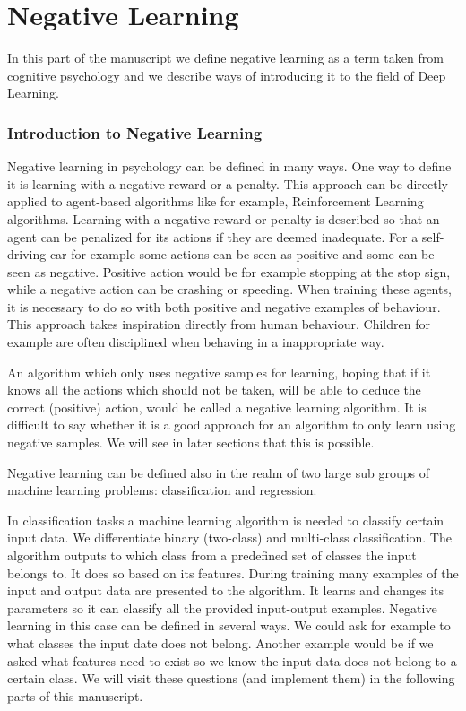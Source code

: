 \documentclass[b5paper]{book}
\begin{document}
\part{Negative Learning}

In this part of the manuscript we define negative learning as a term taken from cognitive psychology and we describe ways of introducing it to the field of Deep Learning.

\section{Introduction to Negative Learning}

Negative learning in psychology can be defined in many ways. One way to define it is learning with a negative reward or a penalty. This approach can be directly applied to agent-based algorithms like for example, Reinforcement Learning algorithms. Learning with a negative reward or penalty is described so that an agent can be penalized for its actions if they are deemed inadequate. For a self-driving car for example some actions can be seen as positive and some can be seen as negative. Positive action would be for example stopping at the stop sign, while a negative action can be crashing or speeding. When training these agents, it is necessary to do so with both positive and negative examples of behaviour. This approach takes inspiration directly from human behaviour. Children for example are often disciplined when behaving in a inappropriate way.

An algorithm which only uses negative samples for learning, hoping that if it knows all the actions which should not be taken, will be able to deduce the correct (positive) action, would be called a negative learning algorithm. It is difficult to say whether it is a good approach for an algorithm to only learn using negative samples. We will see in later sections that this is possible.

Negative learning can be defined also in the realm of two large sub groups of machine learning problems: classification and regression.

In classification tasks a machine learning algorithm is needed to classify certain input data. We differentiate binary (two-class) and multi-class classification. The algorithm outputs to which class from a predefined set of classes the input belongs to. It does so based on its features. During training many examples of the input and output data are presented to the algorithm. It learns and changes its parameters so it can classify all the provided input-output examples. Negative learning in this case can be defined in several ways. We could ask for example to what classes the input date does not belong. Another example would be if we asked what features need to exist so we know the input data does not belong to a certain class. We will visit these questions (and implement them) in the following parts of this manuscript.
\end{document}
